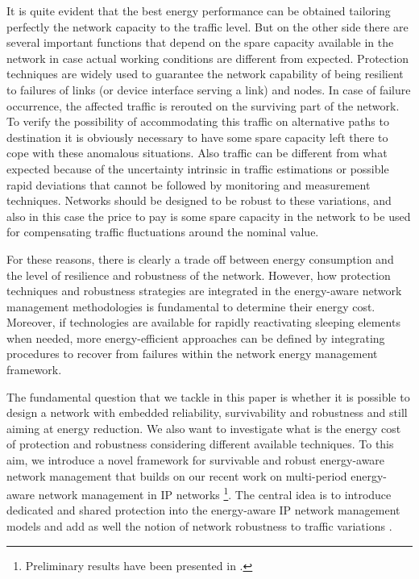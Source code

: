 \documentclass[final,5p,times,twocolumn]{elsarticle}
\begin{document}
It is quite evident that the best energy performance can be obtained tailoring perfectly the network capacity to the traffic level. But on the other side there are several important functions that depend on the spare capacity available in the network in case actual working conditions are different from expected. Protection techniques are widely used to guarantee the network capability of being resilient to failures of links (or device interface serving a link) and nodes. In case of failure occurrence, the affected traffic is rerouted on the surviving part of the network. To verify the possibility of accommodating this traffic on alternative paths to destination it is obviously necessary to have some spare capacity left there to cope with these anomalous situations. Also traffic can be different from what expected because of the uncertainty intrinsic in traffic estimations or possible rapid deviations that cannot be followed by monitoring and measurement techniques. Networks should be designed to be robust to these variations, and also in this case the price to pay is some spare capacity in the network to be used for compensating traffic fluctuations around the nominal value.

For these reasons, there is clearly a trade off between energy consumption and the level of resilience and robustness of the network. However, how protection techniques and robustness strategies are integrated in the energy-aware network management methodologies is fundamental to determine their energy cost. Moreover, if technologies are available for rapidly reactivating sleeping elements when needed, more energy-efficient approaches can be defined by integrating procedures to recover from failures within the network energy management framework.

The fundamental question that we tackle in this paper is whether it is possible to design a network with embedded reliability, survivability and robustness and still aiming at energy reduction. We also want to investigate what is  the energy cost of protection and robustness considering different available techniques. To this aim, we introduce a novel framework for survivable and robust energy-aware network management that
builds on our recent work on multi-period energy-aware network management in IP networks \cite{addis13a}
\footnote{Preliminary results have been presented in \cite{addis12d,addis12e,addis13b}.}.
The central idea is to introduce dedicated and shared protection into the energy-aware IP network management
models and add as well the notion of network robustness to traffic variations \cite{bertsimas11}.
\end{document}
